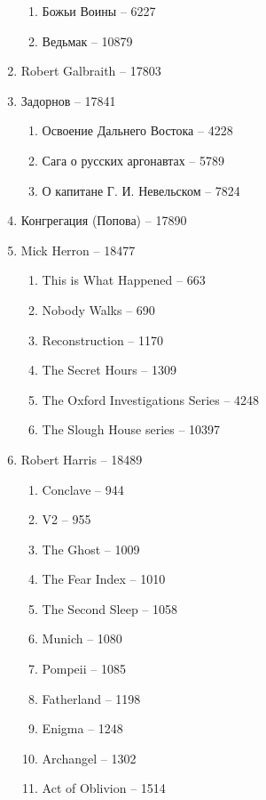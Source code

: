 \documentclass[a4paper, 11pt]{proc} %
\begin{document}
\begin{enumerate}
        \begin{enumerate}
            \item Божьи Воины -- 6227
            \item Ведьмак -- 10879
        \end{enumerate}
    \item Robert Galbraith -- 17803
    \item Задорнов -- 17841
        \begin{enumerate}
            \item Освоение Дальнего Востока -- 4228
            \item Сага о русских аргонавтах -- 5789
            \item О капитане Г. И. Невельском -- 7824
        \end{enumerate}
    \item Конгрегация (Попова) -- 17890
    \item Mick Herron -- 18477
        \begin{enumerate}
            \item This is What Happened -- 663
            \item Nobody Walks -- 690
            \item Reconstruction -- 1170
            \item The Secret Hours -- 1309
            \item The Oxford Investigations Series -- 4248
            \item The Slough House series -- 10397
        \end{enumerate}
    \item Robert Harris -- 18489
        \begin{enumerate}
            \item Conclave -- 944
            \item V2 -- 955
            \item The Ghost -- 1009
            \item The Fear Index -- 1010
            \item The Second Sleep -- 1058
            \item Munich -- 1080
            \item Pompeii -- 1085
            \item Fatherland -- 1198
            \item Enigma -- 1248
            \item Archangel -- 1302
            \item Act of Oblivion -- 1514

\end{enumerate}
\end{enumerate}
\end{document}
